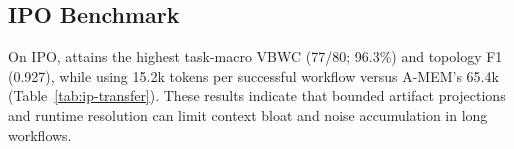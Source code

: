 \subsection{IPO Benchmark}
\begin{table}[tb]
    \centering
    \footnotesize
    \setlength{\tabcolsep}{4pt}
    \caption{IPO results (three trials/task): task-equivalent counts, per-trial Calls, and success-normalized Tok./VBWC.}
    \label{tab:ip-transfer}
\end{table}
On IPO, \method{} attains the highest task-macro VBWC (77/80; 96.3\%) and topology F1 (0.927), while using 15.2k tokens per successful workflow versus A-MEM's 65.4k (Table~\ref{tab:ip-transfer}).
These results indicate that bounded artifact projections and runtime resolution can limit context bloat and noise accumulation in long workflows.

